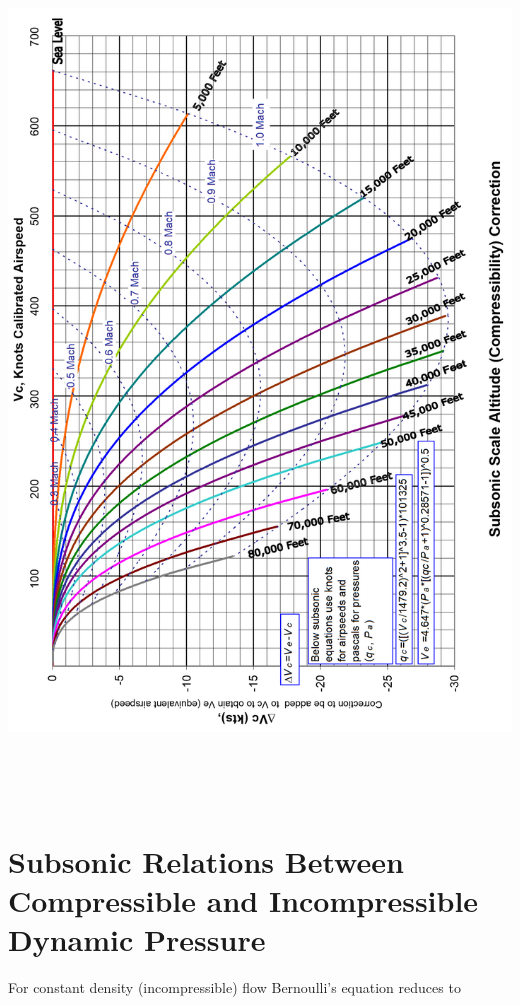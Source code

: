 \documentclass[
]{book}
\begin{document}
\includegraphics[width=6.20764in,height=8.91528in]{media/04/image3.png}

\hypertarget{subsonic-relations-between-compressible-and-incompressible-dynamic-pressure}{%
\section{Subsonic Relations Between Compressible and Incompressible Dynamic Pressure}\label{subsonic-relations-between-compressible-and-incompressible-dynamic-pressure}}

For constant density (incompressible) flow Bernoulli's equation reduces to
\end{document}
